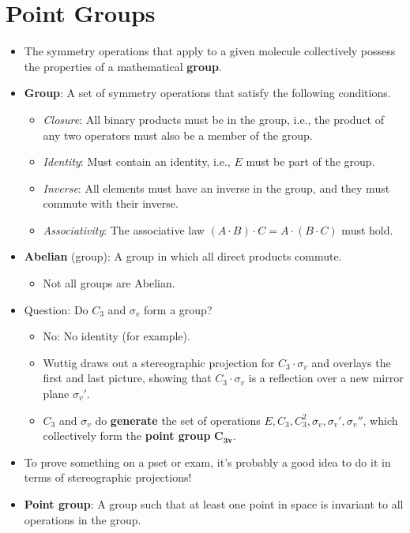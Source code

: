 \documentclass[../notes.tex]{subfiles}
\begin{document}
\section{Point Groups}
\begin{itemize}
    \item {}The symmetry operations that apply to a given molecule collectively possess the properties of a mathematical \textbf{group}.
    \item \textbf{Group}: A set of symmetry operations that satisfy the following conditions.
    \begin{itemize}
        \item \emph{Closure}: All binary products must be in the group, i.e., the product of any two operators must also be a member of the group.
        \item \emph{Identity}: Must contain an identity, i.e., $E$ must be part of the group.
        \item \emph{Inverse}: All elements must have an inverse in the group, and they must commute with their inverse.
        \item \emph{Associativity}: The associative law $(A\cdot B)\cdot C=A\cdot(B\cdot C)$ must hold.
    \end{itemize}
    \item \textbf{Abelian} (group): A group in which all direct products commute.
    \begin{itemize}
        \item Not all groups are Abelian.
    \end{itemize}
    \item Question: Do $C_3$ and $\sigma_v$ form a group?
    \begin{itemize}
        \item No: No identity (for example).
        \item Wuttig draws out a stereographic projection for $C_3\cdot\sigma_v$ and overlays the first and last picture, showing that $C_3\cdot\sigma_v$ is a reflection over a new mirror plane $\sigma_v'$.
        \item $C_3$ and $\sigma_v$ do \textbf{generate} the set of operations $E,C_3,C_3^2,\sigma_v,\sigma_v',\sigma_v''$, which collectively form the \textbf{point group} $\bm{C_{3v}}$.
    \end{itemize}
    \item To prove something on a pset or exam, it's probably a good idea to do it in terms of stereographic projections!
    \item \textbf{Point group}: A group such that at least one point in space is invariant to all operations in the group.

\end{itemize}
\end{document}
